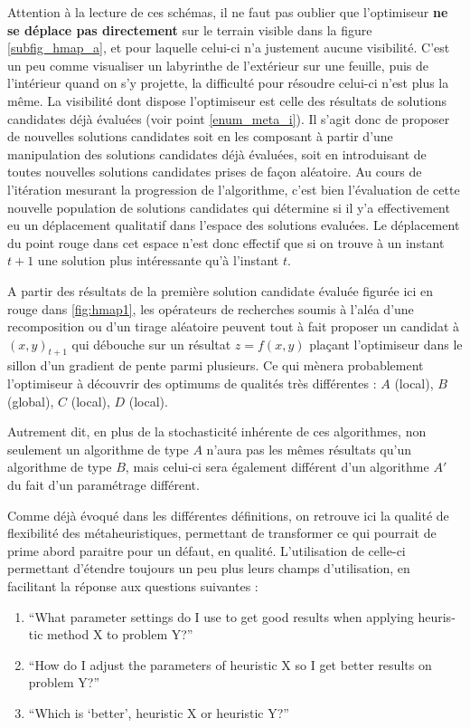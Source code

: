 Attention à la lecture de ces schémas, il ne faut pas oublier que l'optimiseur \textbf{ne se déplace pas directement} sur le terrain visible dans la figure \ref{subfig_hmap_a}, et pour laquelle celui-ci n'a justement aucune visibilité. C'est un peu comme visualiser un labyrinthe de l'extérieur sur une feuille, puis de l'intérieur quand on s'y projette, la difficulté pour résoudre celui-ci n'est plus la même. La visibilité dont dispose l'optimiseur est celle des résultats de solutions candidates déjà évaluées (voir point \ref{enum_meta_i}). Il s'agit donc de proposer de nouvelles solutions candidates soit en les composant à partir d'une manipulation des solutions candidates déjà évaluées, soit en introduisant de toutes nouvelles solutions candidates prises de façon aléatoire. Au cours de l'itération mesurant la progression de l'algorithme, c'est bien l'évaluation de cette nouvelle population de solutions candidates qui détermine si il y'a effectivement eu un déplacement qualitatif dans l'espace des solutions evaluées. Le déplacement du point rouge dans cet espace n'est donc effectif que si on trouve à un instant $t + 1$ une solution plus intéressante qu'à l'instant $t$.

A partir des résultats de la première solution candidate évaluée figurée ici en rouge dans \ref{fig:hmap1}, les opérateurs de recherches soumis à l'aléa d'une recomposition ou d'un tirage aléatoire peuvent tout à fait proposer un candidat à $(x,y)_{t+1}$ qui débouche sur un résultat $z = f(x,y)$ plaçant l'optimiseur dans le sillon d'un gradient de pente parmi plusieurs. Ce qui mènera probablement l'optimiseur à découvrir des optimums de qualités très différentes : $A$ (local), $B$ (global), $C$ (local), $D$ (local).

Autrement dit, en plus de la stochasticité inhérente de ces algorithmes, non seulement un algorithme de type $A$ n'aura pas les mêmes résultats qu'un algorithme de type $B$, mais celui-ci sera également différent d'un algorithme $A'$ du fait d'un paramétrage différent.

Comme déjà évoqué dans les différentes définitions, on retrouve ici la qualité de flexibilité des métaheuristiques, permettant de transformer ce qui pourrait de prime abord paraitre pour un défaut, en qualité. L'utilisation de celle-ci permettant d'étendre toujours un peu plus leurs champs d'utilisation, en facilitant la réponse aux questions suivantes  :
\begin{enumerate}
\item  \foreignquote{english}{What parameter settings do I use to get good results when applying heuristic method X to problem Y?}
\item  \foreignquote{english}{How do I adjust the parameters of heuristic X so I get better results on problem Y?}
\item \foreignquote{english}{Which is \enquote{better}, heuristic X or heuristic Y?}
\end{enumerate}

